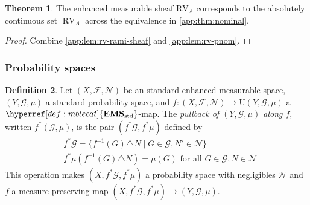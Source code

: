 \documentclass[
  sigconf,
  screen, ]{acmart}
\theoremstyle{definition}
\newtheorem{theorem}{Theorem}[section]
\newtheorem{definition}[theorem]{Definition}
\newcommand\calF{\mathcal F}
\newcommand\calG{\mathcal G}
\newcommand\calN{\mathcal N}
\newcommand\nref[2]{\hyperref[#1]{#2}} \newcommand\checkhigh{{\huge{\color{red}\textbf{TODO: check}}}}
\newcommand\texforgetmu{\mathrm{U}}
\newcommand\forgetmu{{\nref{def:forgetmu}{\texforgetmu}}}
\newcommand\texagoodname{absolutely continuous set}
\newcommand\agoodname{\texagoodname}
\newcommand\sheafcatadj{enhanced measurable}
\newcommand\texgoodsheaf{\sheafcatadj{} sheaf}
\newcommand\goodsheaf{\texgoodsheaf}
\newcommand\texStdMble{\mathbf{EMS}_{\rm std}}
\newcommand\StdMble{{\nref{def:mblecat}{\texStdMble}}}
\newcommand\RV{\mathrm{RV}}
\newcommand\texgRV{\overline{\operatorname{RV}}}
\newcommand\gRV{{\nref{def:gRV}{\texgRV}}}
\begin{document}
\begin{theorem} \label{app:lem:rv-corresp}
  The \goodsheaf{}
  $\nref{app:lem:rv-mble-sheaf}{\RV_A}$
  corresponds to the \agoodname{}
  $\gRV_A$
  across
  the equivalence
  in \cref{app:thm:nominal}.
\end{theorem}
\begin{proof}
  Combine \cref{app:lem:rv-rami-sheaf}
  and \cref{app:lem:rv-pnom}.
\end{proof}


\subsubsection{Probability spaces} \label{app:sec:pspcs-nom-calc}

\renewcommand\epbmeas[2]{{\nref{app:def:epb}{#1^*}}#2}
\begin{definition} \label{app:def:epb}
  Let $(X,\calF,\calN)$
  be an standard enhanced measurable space,
  $(Y,\calG,\mu)$ a standard probability space,
  and $f : (X,\calF,\calN)\to\forgetmu(Y,\calG,\mu)$
  a $\StdMble$-map.
  The \emph{pullback of $(Y,\calG,\mu)$ along $f$},
  written $\epbmeas f(\calG,\mu)$,
  is the pair $(\epbmeas f \calG,\epbmeas f \mu)$ defined by
  \begin{align*}
    &\epbmeas f\calG = \{f^{-1}(G)\triangle N \mid G\in\calG,N'\in\calN\} \\
    &\epbmeas f\mu(f^{-1}(G)\triangle N) = \mu(G)\text{ for all $G\in\calG,N\in\calN$}
  \end{align*}
  This operation makes $(X,\epbmeas f \calG,\epbmeas f \mu)$
  a probability space with negligibles $\calN$
  and $f$ a measure-preserving map $(X,\epbmeas f\calG,\epbmeas f\mu)\to(Y,\calG,\mu)$.
\end{definition}
\end{document}
